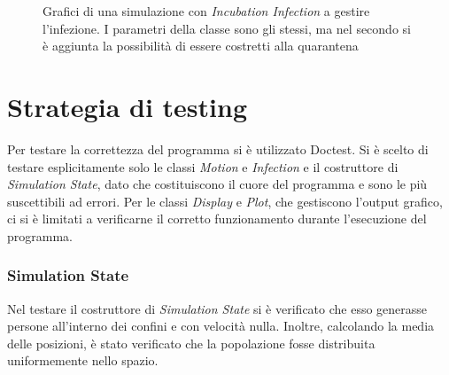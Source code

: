 \documentclass[a4paper,10pt,twocolumn]{article}
\begin{document}
\begin{figure}[p]
    \centering
    \caption{Grafici di una simulazione con \emph{Incubation Infection} a gestire l'infezione. I parametri della classe sono gli stessi, ma nel secondo si è aggiunta la possibilità di essere costretti alla quarantena}
    \label{fig:incubation}
\end{figure}

\section{Strategia di testing}
Per testare la correttezza del programma si è utilizzato Doctest. Si è scelto di testare esplicitamente solo le classi \emph{Motion} e \emph{Infection} e il costruttore di \emph{Simulation State}, dato che costituiscono il cuore del programma e sono le più suscettibili ad errori. Per le classi \emph{Display} e \emph{Plot}, che gestiscono l'output grafico, ci si è limitati a verificarne il corretto funzionamento durante l'esecuzione del programma.

\subsubsection*{Simulation State}
Nel testare il costruttore di \emph{Simulation State} si è verificato che esso generasse persone all'interno dei confini e con velocità nulla. Inoltre, calcolando la media delle posizioni, è stato verificato che la popolazione fosse distribuita uniformemente nello spazio.
\end{document}
